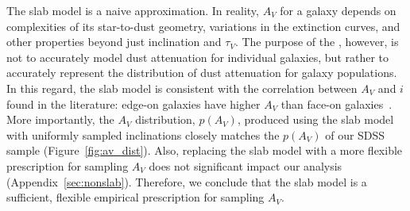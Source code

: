 The slab model is a naive approximation. In reality, $A_V$ for a galaxy depends on complexities 
of its star-to-dust geometry, variations in the extinction curves, and other
properties beyond just inclination and $\tau_V$. The purpose of the \eda,
however, is not to accurately model dust attenuation for individual galaxies,
but rather to accurately represent the distribution of dust attenuation for galaxy
populations. In this regard, the slab model is consistent with the
correlation between $A_V$ and $i$ found in the literature: edge-on galaxies
have higher $A_V$ than face-on galaxies~\citep[\eg][]{conroy2010, wild2011,
battisti2017, salim2020}. More
importantly, the $A_V$ distribution, $p(A_V)$, produced using the slab model with
uniformly sampled inclinations closely matches the $p(A_V)$ of our SDSS sample
(Figure~\ref{fig:av_dist}). Also, replacing the slab model with a more flexible
prescription for sampling $A_V$ does not significant impact our analysis 
(Appendix~\ref{sec:nonslab}). Therefore, we conclude that the slab model is a
sufficient, flexible empirical prescription for sampling $A_V$. 

